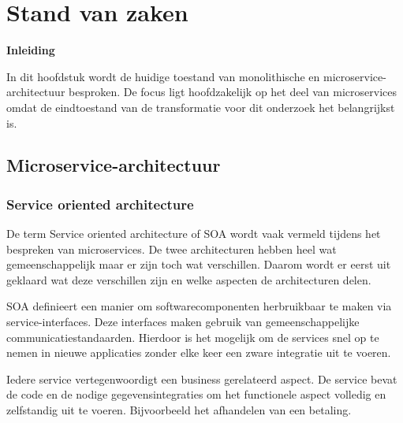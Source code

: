 \label{ch:stand-van-zaken}
\graphicspath{{./img/}}

\chapter{Stand van zaken}
\textbf{Inleiding}

In dit hoofdstuk wordt de huidige toestand van monolithische en microservice-architectuur besproken. De focus ligt hoofdzakelijk op het deel van microservices omdat de eindtoestand van de transformatie voor dit onderzoek het belangrijkst is.

\section{Microservice-architectuur}

\subsection{Service oriented architecture}
De term Service oriented architecture of SOA wordt vaak vermeld tijdens het bespreken van microservices. De twee architecturen hebben heel wat gemeenschappelijk maar er zijn toch wat verschillen. Daarom wordt er eerst uit geklaard wat deze verschillen zijn en welke aspecten de architecturen delen. 

SOA definieert een manier om softwarecomponenten herbruikbaar te maken via service-interfaces. Deze interfaces maken gebruik van gemeenschappelijke communicatiestandaarden. Hierdoor is het mogelijk om de services snel op te nemen in nieuwe applicaties zonder elke keer een zware integratie uit te voeren.

Iedere service vertegenwoordigt een business gerelateerd aspect. De service bevat de code en de nodige gegevensintegraties om het functionele aspect volledig en zelfstandig uit te voeren. Bijvoorbeeld het afhandelen van een betaling.\\


